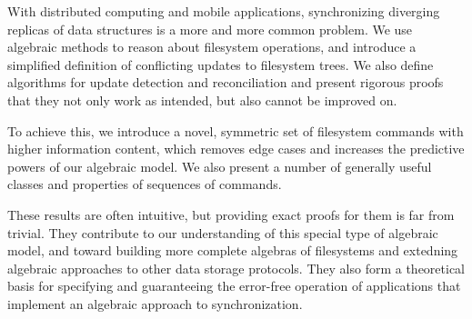 
With distributed computing and mobile applications,
synchronizing diverging replicas of data structures is a more and more common problem.
We use algebraic methods to reason about filesystem operations, 
and introduce a simplified definition of conflicting updates to filesystem trees.
We also define algorithms for update detection and reconciliation
and present rigorous proofs that they not only work as intended,
but also cannot be improved on.

To achieve this, we introduce a novel, symmetric set of filesystem commands
with higher information content,
which removes edge cases
and increases the predictive powers of our algebraic model.
We also present a number of generally useful classes and properties
of sequences of commands.

These results are often intuitive,
but providing exact proofs for them is far from trivial.
They contribute to our understanding of this special type of algebraic model,
and toward building more complete algebras
of filesystems 
and extedning algebraic approaches to other data storage protocols.
They also form a theoretical basis for
specifying
and guaranteeing the error-free operation
of applications that implement an algebraic approach to synchronization.
